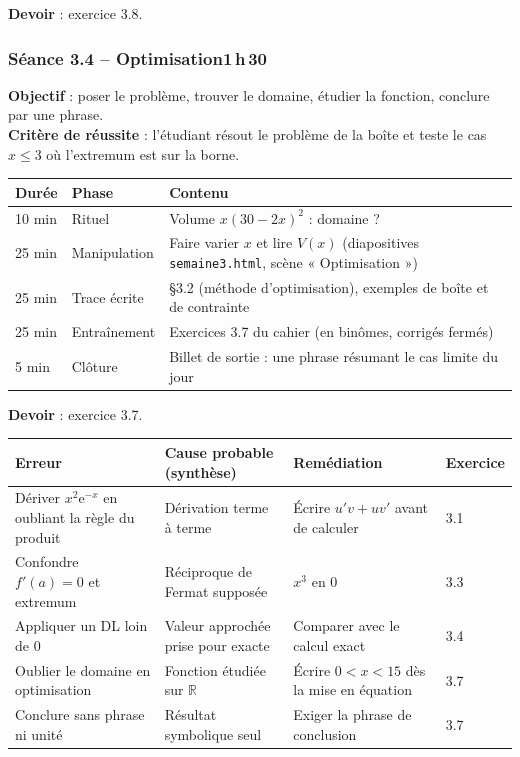 \documentclass[10.5pt,a4paper]{article}
\newif\ifprof
\newcommand{\R}{\mathbb{R}}\newcommand{\C}{\mathbb{C}}\newcommand{\e}{\mathrm{e}}
\newcommand{\synth}{\textsf{\textcolor{ardoise}{(synthèse)}}}
\newcommand{\profonly}[1]{\ifprof #1\fi}
\begin{document}
\textbf{Devoir} : exercice 3.8.\profonly{ \textbf{Point de vigilance} : Ne pas conclure d'un seul $f'(a)=0$ ; citer la réciproque fausse de Fermat.}\par
{}\subsubsection*{\textcolor{marine}{Séance 3.4 -- Optimisation}\hfill\normalfont\small\textcolor{ardoise}{1\,h\,30}}
\begin{objectif}\textbf{Objectif} : poser le problème, trouver le domaine, étudier la fonction, conclure par une phrase.\\\textbf{Critère de réussite} : l'étudiant résout le problème de la boîte et teste le cas $x\le3$ où l'extremum est sur la borne.\end{objectif}\nopagebreak
\begin{longtable}{@{}p{1.1cm}p{2.4cm}p{12.4cm}@{}}
\toprule \textbf{Durée} & \textbf{Phase} & \textbf{Contenu}\\ \midrule\endhead
10 min & Rituel & Volume $x(30-2x)^2$ : domaine ?\\
25 min & Manipulation & Faire varier $x$ et lire $V(x)$ (diapositives \texttt{semaine3.html}, scène « Optimisation »)\\
25 min & Trace écrite & \S3.2 (méthode d'optimisation), exemples de boîte et de contrainte\\
25 min & Entraînement & Exercices 3.7 du cahier (en binômes, corrigés fermés)\\
5 min & Clôture & Billet de sortie : une phrase résumant le cas limite du jour\\ \bottomrule\end{longtable}\nopagebreak
\textbf{Devoir} : exercice 3.7.\profonly{ \textbf{Point de vigilance} : Vérifier que le point critique est dans le domaine ; comparer aux bornes.}\par
\ifprof
\begin{longtable}{@{}p{4.8cm}p{3.6cm}p{4.9cm}p{1.6cm}@{}}
\toprule \textbf{Erreur} & \textbf{Cause probable \synth} & \textbf{Remédiation} & \textbf{Exercice}\\ \midrule\endhead
Dériver $x^2\e^{-x}$ en oubliant la règle du produit & Dérivation terme à terme & Écrire $u'v+uv'$ avant de calculer & 3.1\\
Confondre $f'(a)=0$ et extremum & Réciproque de Fermat supposée & $x^3$ en $0$ & 3.3\\
Appliquer un DL loin de $0$ & Valeur approchée prise pour exacte & Comparer avec le calcul exact & 3.4\\
Oublier le domaine en optimisation & Fonction étudiée sur $\R$ & Écrire $0<x<15$ dès la mise en équation & 3.7\\
Conclure sans phrase ni unité & Résultat symbolique seul & Exiger la phrase de conclusion & 3.7\\
\bottomrule\end{longtable}
\end{document}
